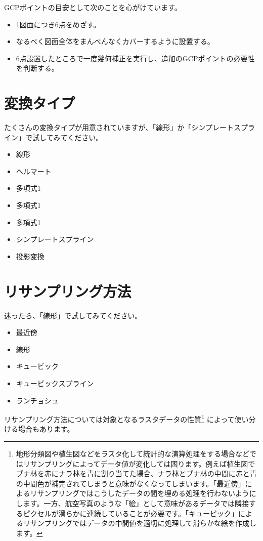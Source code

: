 \documentclass[14Q,twocolumn]{jsarticle}
\begin{document}
GCPポイントの目安として次のことを心がけています。

\begin{itemize}
\item 1図面につき6点をめざす。
\item なるべく図面全体をまんべんなくカバーするように設置する。
\item 6点設置したところで一度幾何補正を実行し、追加のGCPポイントの必要性を判断する。
\end{itemize}

\section{変換タイプ}
たくさんの変換タイプが用意されていますが、「線形」か「シンプレートスプライン」で試してみてください。
\begin{itemize}
\item 線形
\item ヘルマート
\item 多項式1
\item 多項式1
\item 多項式1
\item シンプレートスプライン
\item 投影変換
\end{itemize}

\section{リサンプリング方法}
迷ったら、「線形」で試してみてください。

\begin{itemize}
\item 最近傍
\item 線形
\item キュービック
\item キュービックスプライン
\item ランチョシュ
\end{itemize}

リサンプリング方法については対象となるラスタデータの性質\footnote{
地形分類図や植生図などをラスタ化して統計的な演算処理をする場合などではリサンプリングによってデータ値が変化しては困ります。例えば植生図でブナ林を赤にナラ林を青に割り当てた場合、ナラ林とブナ林の中間に赤と青の中間色が補完されてしまうと意味がなくなってしまいます。「最近傍」によるリサンプリングではこうしたデータの間を埋める処理を行わないようにします。一方、航空写真のような「絵」として意味があるデータでは隣接するピクセルが滑らかに連続していることが必要です。「キュービック」によるリサンプリングではデータの中間値を適切に処理して滑らかな絵を作成します。
}
によって使い分ける場合もあります。
\end{document}
